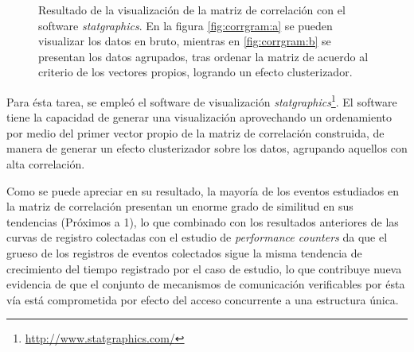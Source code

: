 \begin{figure}[h!]
	\centering
	\hspace*{\fill}
	\hfill
	\caption{Resultado de la visualización de la matriz de correlación con el software \emph{statgraphics}. En la figura \ref{fig:corrgram:a} se pueden visualizar los datos en bruto, mientras en \ref{fig:corrgram:b} se presentan los datos agrupados, tras ordenar la matriz de acuerdo al criterio de los vectores propios, logrando un efecto clusterizador.}
	\label{fig:corrmatrix}
	\hspace*{\fill}
\end{figure}


Para ésta tarea, se empleó el software de visualización \emph{statgraphics}\footnote{\url{http://www.statgraphics.com/}}. El software tiene la capacidad de generar una visualización aprovechando un ordenamiento por medio del primer vector propio de la matriz de correlación construida, de manera de generar un efecto clusterizador sobre los datos, agrupando aquellos con alta correlación.

Como se puede apreciar en su resultado, la mayoría de los eventos estudiados en la matriz de correlación presentan un enorme grado de similitud en sus tendencias (Próximos a 1), lo que combinado con los resultados anteriores de las curvas de registro colectadas con el estudio de \emph{performance counters} da que el grueso de los registros de eventos colectados sigue la misma tendencia de crecimiento del tiempo registrado por el caso de estudio, lo que contribuye nueva evidencia de que el conjunto de mecanismos de comunicación verificables por ésta vía está comprometida por efecto del acceso concurrente a una estructura única.

